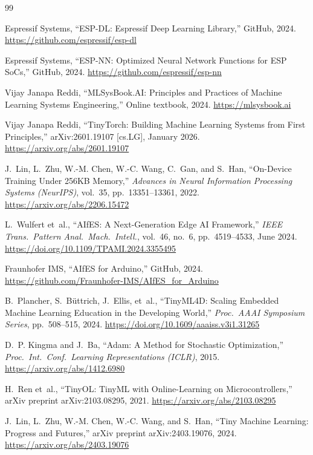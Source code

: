 \documentclass[12pt]{article}
\begin{document}
\begin{thebibliography}{99}

Espressif Systems, ``ESP-DL: Espressif Deep Learning Library,'' GitHub, 2024.
\url{https://github.com/espressif/esp-dl}

Espressif Systems, ``ESP-NN: Optimized Neural Network Functions for ESP SoCs,'' GitHub, 2024.
\url{https://github.com/espressif/esp-nn}

Vijay Janapa Reddi, ``MLSysBook.AI: Principles and Practices of Machine Learning Systems Engineering,'' Online textbook, 2024.
\url{https://mlsysbook.ai}

Vijay Janapa Reddi, ``TinyTorch: Building Machine Learning Systems from First Principles,'' arXiv:2601.19107 [cs.LG], January 2026.
\url{https://arxiv.org/abs/2601.19107}

J.~Lin, L.~Zhu, W.-M. Chen, W.-C. Wang, C.~Gan, and S.~Han, ``On-Device Training Under 256KB Memory,'' \textit{Advances in Neural Information Processing Systems (NeurIPS)}, vol.\ 35, pp.\ 13351--13361, 2022.
\url{https://arxiv.org/abs/2206.15472}

L.~Wulfert et~al., ``AIfES: A Next-Generation Edge AI Framework,'' \textit{IEEE Trans.\ Pattern Anal.\ Mach.\ Intell.}, vol.\ 46, no.\ 6, pp.\ 4519--4533, June 2024.
\url{https://doi.org/10.1109/TPAMI.2024.3355495}

Fraunhofer IMS, ``AIfES for Arduino,'' GitHub, 2024.
\url{https://github.com/Fraunhofer-IMS/AIfES_for_Arduino}

B.~Plancher, S.~B\"{u}ttrich, J.~Ellis, et~al.,
``TinyML4D: Scaling Embedded Machine Learning Education in the Developing World,''
\textit{Proc.\ AAAI Symposium Series}, pp.\ 508--515, 2024.
\url{https://doi.org/10.1609/aaaiss.v3i1.31265}

D.~P. Kingma and J.~Ba, ``Adam: A Method for Stochastic Optimization,'' \textit{Proc.\ Int.\ Conf.\ Learning Representations (ICLR)}, 2015.
\url{https://arxiv.org/abs/1412.6980}

H.~Ren et~al., ``TinyOL: TinyML with Online-Learning on Microcontrollers,'' arXiv preprint arXiv:2103.08295, 2021.
\url{https://arxiv.org/abs/2103.08295}

J.~Lin, L.~Zhu, W.-M. Chen, W.-C. Wang, and S.~Han, ``Tiny Machine Learning: Progress and Futures,'' arXiv preprint arXiv:2403.19076, 2024.
\url{https://arxiv.org/abs/2403.19076}


\end{thebibliography}
\end{document}

